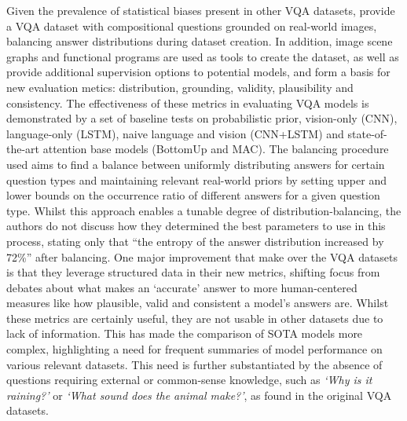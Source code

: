 Given the prevalence of statistical biases present in other VQA datasets, \citeauthor{hudson2019gqa} provide a VQA dataset with compositional questions grounded on real-world images, balancing answer distributions during dataset creation. In addition, image scene graphs and functional programs are used as tools to create the dataset, as well as provide additional supervision options to potential models, and form a basis for new evaluation metics: distribution, grounding, validity, plausibility and consistency. The effectiveness of these metrics in evaluating VQA models is demonstrated by a set of baseline tests on probabilistic prior, vision-only (CNN), language-only (LSTM), naive language and vision (CNN+LSTM) and state-of-the-art attention base models (BottomUp and MAC). The balancing procedure used aims to find a balance between uniformly distributing answers for certain question types and maintaining relevant real-world priors by setting upper and lower bounds on the occurrence ratio of different answers for a given question type. Whilst this approach enables a tunable degree of distribution-balancing, the authors do not discuss how they determined the best parameters to use in this process, stating only that ``the entropy of the answer distribution increased by 72\%'' after balancing. One major improvement that \citeauthor{hudson2019gqa} make over the VQA datasets is that they leverage structured data in their new metrics, shifting focus from debates about what makes an `accurate' answer to more human-centered measures like how plausible, valid and consistent a model's answers are. Whilst these metrics are certainly useful, they are not usable in other datasets due to lack of information. This has made the comparison of SOTA models more complex, highlighting a need for frequent summaries of model performance on various relevant datasets. This need is further substantiated by the absence of questions requiring external or common-sense knowledge, such as \textit{`Why is it raining?'} or \textit{`What sound does the animal make?'}, as found in the original VQA datasets.